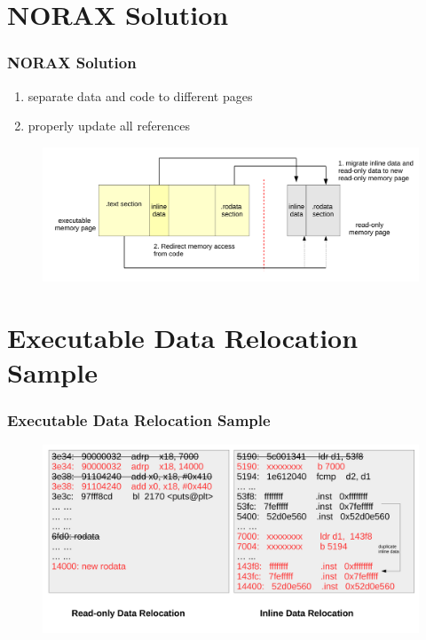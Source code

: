 \documentclass[aspectratio=169]{beamer}
\begin{document}

\section{NORAX Solution}
\begin{frame}
\frametitle{NORAX Solution}
\begin{enumerate}
\item {\large separate data and code to different pages}
\item {\large properly update all references}
\end{enumerate}
\begin{figure}
\includegraphics[width=1.0\linewidth]{figures/solution.pdf}
\end{figure}
\end{frame}


\section{Executable Data Relocation Sample}
\begin{frame}
\frametitle{Executable Data Relocation Sample}
\begin{figure}
\includegraphics[width=1.0\linewidth]{figures/rodata.pdf}
\end{figure}
\end{frame}
\end{document}
